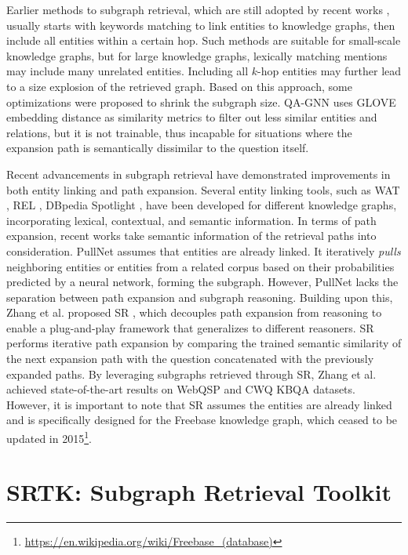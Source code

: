 \documentclass[runningheads]{llncs}
\begin{document}
Earlier methods to subgraph retrieval, which are still adopted by recent works \cite{yasunaga2021qagnn,liu2021kgbart,das2022kgqacase}, usually starts with keywords matching to link entities to knowledge graphs, then include all entities within a certain hop. Such methods are suitable for small-scale knowledge graphs, but for large knowledge graphs, lexically matching mentions may include many unrelated entities. Including all $k$-hop entities may further lead to a size explosion of the retrieved graph. Based on this approach, some optimizations were proposed to shrink the subgraph size. QA-GNN \cite{yasunaga2021qagnn} uses GLOVE embedding distance as similarity metrics to filter out less similar entities and relations, but it is not trainable, thus incapable for situations where the expansion path is semantically dissimilar to the question itself.

Recent advancements in subgraph retrieval have demonstrated improvements in both entity linking and path expansion. Several entity linking tools, such as WAT \cite{piccinno2014wat}, REL \cite{vanHulst2020REL}, DBpedia Spotlight \cite{mendes2011dbpediaspotlight}, have been developed for different knowledge graphs, incorporating lexical, contextual, and semantic information. In terms of path expansion, recent works take semantic information of the retrieval paths into consideration. PullNet\cite{sun2019pullnet} assumes that entities are already linked. It iteratively \textit{pulls} neighboring entities or entities from a related corpus based on their probabilities predicted by a neural network, forming the subgraph. However,  PullNet lacks the separation between path expansion and subgraph reasoning. Building upon this, Zhang et al. proposed SR \cite{zhang2022ruckbqa}, which decouples path expansion from reasoning to enable a plug-and-play framework that generalizes to different reasoners. SR performs iterative path expansion by comparing the trained semantic similarity of the next expansion path with the question concatenated with the previously expanded paths. By leveraging subgraphs retrieved through SR, Zhang et al. achieved state-of-the-art results on WebQSP \cite{yih2016webqsp} and CWQ \cite{talmor2018cwq} KBQA datasets. However, it is important to note that SR assumes the entities are already linked and is specifically designed for the Freebase knowledge graph, which ceased to be updated in 2015\footnote{\url{https://en.wikipedia.org/wiki/Freebase\_(database)}}.

\section{SRTK: Subgraph Retrieval Toolkit}
\end{document}
